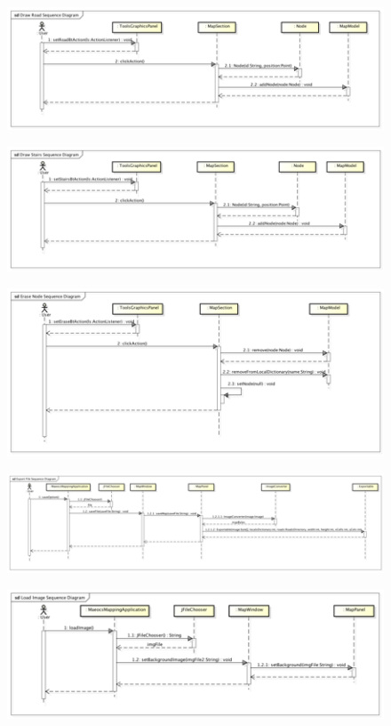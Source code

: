 \documentclass[11pt]{book}
\begin{document}
\begin{figure}[H]
  \centering
    \includegraphics[scale=1]{secuencia6}
\end{figure}
\begin{figure}[H]
  \centering
    \includegraphics[scale=1]{secuencia7}
\end{figure}
\begin{figure}[H]
  \centering
    \includegraphics[scale=1]{secuencia8}
\end{figure}
\begin{figure}[H]
  \centering
    \includegraphics[scale=1]{secuencia9}
\end{figure}
\begin{figure}[H]
  \centering
    \includegraphics[scale=1]{secuencia10}
\end{figure}
\end{document}
